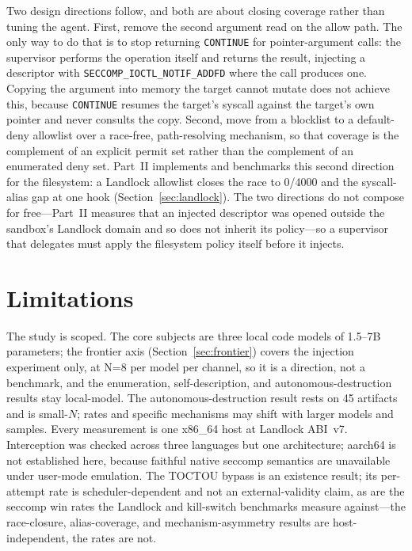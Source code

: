 \documentclass[11pt]{article}
\newcommand{\Nrace}{4000}
\newcommand{\AutoAtt}{45}
\begin{document}
Two design directions follow, and both are about closing coverage rather than tuning the agent. First,
remove the second argument read on the allow path. The only way to do that is to stop returning
\texttt{CONTINUE} for pointer-argument calls: the supervisor performs the operation itself and returns
the result, injecting a descriptor with \texttt{SECCOMP\_IOCTL\_NOTIF\_ADDFD} where the call produces
one. Copying the argument into memory the target cannot mutate does not achieve this, because
\texttt{CONTINUE} resumes the target's syscall against the target's own pointer and never consults the
copy. Second, move from a blocklist to a default-deny allowlist over a race-free,
path-resolving mechanism, so that coverage is the complement of an explicit permit set rather than the
complement of an enumerated deny set. Part~II implements and benchmarks this second direction for the
filesystem: a Landlock allowlist closes the race to 0/\Nrace{} and the syscall-alias gap at one hook
(Section~\ref{sec:landlock}). The two directions do not compose for free---Part~II measures that an
injected descriptor was opened outside the sandbox's Landlock domain and so does not inherit its
policy---so a supervisor that delegates must apply the filesystem policy itself before it injects.

\section{Limitations}\label{sec:limits}

The study is scoped. The core subjects are three local code models of 1.5--7B parameters; the frontier
axis (Section~\ref{sec:frontier}) covers the injection experiment only, at N=8 per model per channel, so
it is a direction, not a benchmark, and the enumeration, self-description, and autonomous-destruction
results stay local-model. The autonomous-destruction result rests on \AutoAtt{} artifacts and is
small-$N$; rates and specific mechanisms may shift with larger models and samples. Every measurement is
one x86\_64 host at Landlock ABI~v7. Interception was checked across three languages but one architecture;
aarch64 is not established here, because faithful native seccomp semantics are unavailable under user-mode
emulation. The TOCTOU bypass is an existence result; its per-attempt rate is scheduler-dependent and not
an external-validity claim, as are the seccomp win rates the Landlock and kill-switch benchmarks measure
against---the race-closure, alias-coverage, and mechanism-asymmetry results are host-independent, the rates
are not.
\end{document}
